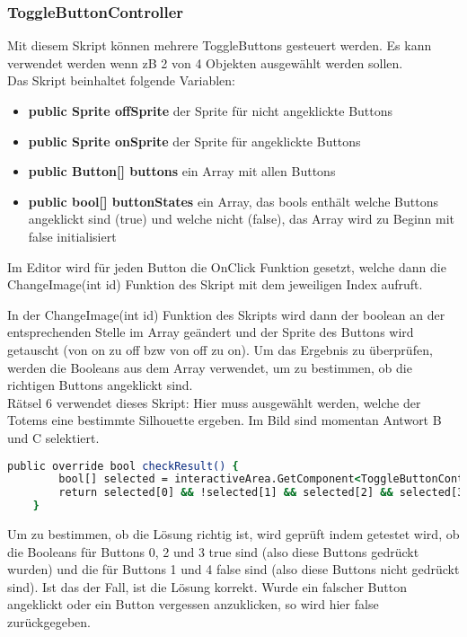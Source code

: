 {\subsubsection{ToggleButtonController}
Mit diesem Skript können mehrere ToggleButtons gesteuert werden. Es kann verwendet werden wenn zB 2 von 4 Objekten ausgewählt werden sollen.\\
Das Skript beinhaltet folgende Variablen:
\begin{itemize}
\item \textbf{public Sprite offSprite} der Sprite für nicht angeklickte Buttons
\item \textbf{public Sprite onSprite} der Sprite für angeklickte Buttons
\item \textbf{public Button[] buttons} ein Array mit allen Buttons
\item \textbf{public bool[] buttonStates} ein Array, das bools enthält welche Buttons angeklickt sind (true) und welche nicht (false), das Array wird zu Beginn mit false initialisiert
\end{itemize}

Im Editor wird für jeden Button die OnClick Funktion gesetzt, welche dann die ChangeImage(int id) Funktion des Skript mit dem jeweiligen Index aufruft.

In der ChangeImage(int id) Funktion des Skripts wird dann der boolean an der entsprechenden Stelle im Array geändert und der Sprite des Buttons wird getauscht (von on zu off bzw von off zu on). Um das Ergebnis zu überprüfen, werden die Booleans aus dem Array verwendet, um zu bestimmen, ob die richtigen Buttons angeklickt sind.\\

Rätsel 6 verwendet dieses Skript:
Hier muss ausgewählt werden, welche der Totems eine bestimmte Silhouette ergeben. Im Bild sind momentan Antwort B und C selektiert.
\begin{lstlisting}[language=csh, caption={checkResult Methode in der Klasse von Rätsel 6}]
public override bool checkResult() {
        bool[] selected = interactiveArea.GetComponent<ToggleButtonController>().buttonStates;
        return selected[0] && !selected[1] && selected[2] && selected[3] && !selected[4];
    }
\end{lstlisting}
Um zu bestimmen, ob die Lösung richtig ist, wird geprüft indem getestet wird, ob die Booleans für Buttons 0, 2 und 3 true sind (also diese Buttons gedrückt wurden) und die für Buttons 1 und 4 false sind (also diese Buttons nicht gedrückt sind). Ist das der Fall, ist die Lösung korrekt. Wurde ein falscher Button angeklickt oder ein Button vergessen anzuklicken, so wird hier false zurückgegeben.

}
